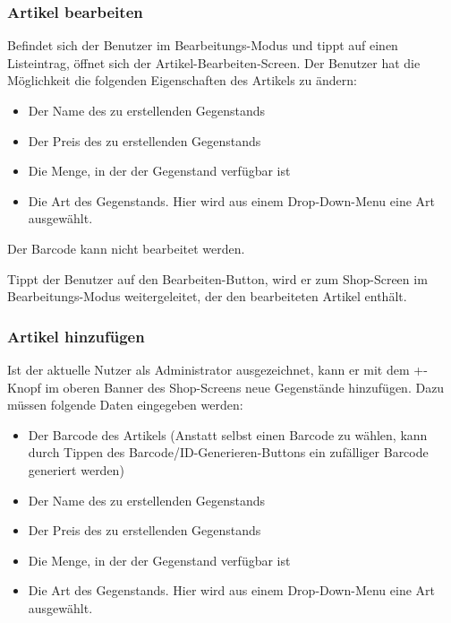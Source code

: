 \subsubsection{Artikel bearbeiten} \label{subsubsec:shop-edit-items}

Befindet sich der Benutzer im Bearbeitungs-Modus und tippt auf einen Listeintrag, öffnet sich der Artikel-Bearbeiten-Screen.
Der Benutzer hat die Möglichkeit die folgenden Eigenschaften des Artikels zu ändern:

\begin{itemize}
	\item Der Name des zu erstellenden Gegenstands

	\item Der Preis des zu erstellenden Gegenstands

	\item Die Menge, in der der Gegenstand verfügbar ist

	\item Die Art des Gegenstands.
	Hier wird aus einem Drop-Down-Menu eine Art ausgewählt.
\end{itemize}

Der Barcode kann nicht bearbeitet werden.

Tippt der Benutzer auf den Bearbeiten-Button, wird er zum Shop-Screen im Bearbeitungs-Modus weitergeleitet, der den bearbeiteten Artikel enthält.

\subsubsection{Artikel hinzufügen} \label{subsubsec:shop-add-items}

Ist der aktuelle Nutzer als Administrator ausgezeichnet, kann er mit dem +-Knopf im oberen Banner des Shop-Screens neue Gegenstände hinzufügen.
Dazu müssen folgende Daten eingegeben werden:

\begin{itemize}
	\item Der Barcode des Artikels (Anstatt selbst einen Barcode zu wählen, kann durch Tippen des Barcode/ID-Generieren-Buttons ein zufälliger Barcode generiert werden)

	\item Der Name des zu erstellenden Gegenstands

	\item Der Preis des zu erstellenden Gegenstands

	\item Die Menge, in der der Gegenstand verfügbar ist

	\item Die Art des Gegenstands.
	Hier wird aus einem Drop-Down-Menu eine Art ausgewählt.
\end{itemize}

